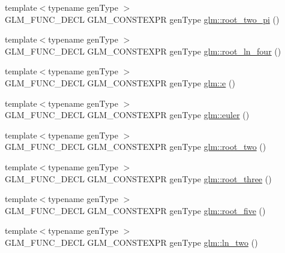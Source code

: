 \begin{DoxyCompactItemize}
\item 
{\footnotesize template$<$typename gen\+Type $>$ }\\G\+L\+M\+\_\+\+F\+U\+N\+C\+\_\+\+D\+E\+CL G\+L\+M\+\_\+\+C\+O\+N\+S\+T\+E\+X\+PR gen\+Type \hyperlink{group__gtc__constants_ga2bcedc575039fe0cd765742f8bbb0bd3}{glm\+::root\+\_\+two\+\_\+pi} ()
\item 
{\footnotesize template$<$typename gen\+Type $>$ }\\G\+L\+M\+\_\+\+F\+U\+N\+C\+\_\+\+D\+E\+CL G\+L\+M\+\_\+\+C\+O\+N\+S\+T\+E\+X\+PR gen\+Type \hyperlink{group__gtc__constants_ga4129412e96b33707a77c1a07652e23e2}{glm\+::root\+\_\+ln\+\_\+four} ()
\item 
{\footnotesize template$<$typename gen\+Type $>$ }\\G\+L\+M\+\_\+\+F\+U\+N\+C\+\_\+\+D\+E\+CL G\+L\+M\+\_\+\+C\+O\+N\+S\+T\+E\+X\+PR gen\+Type \hyperlink{group__gtc__constants_ga4b7956eb6e2fbedfc7cf2e46e85c5139}{glm\+::e} ()
\item 
{\footnotesize template$<$typename gen\+Type $>$ }\\G\+L\+M\+\_\+\+F\+U\+N\+C\+\_\+\+D\+E\+CL G\+L\+M\+\_\+\+C\+O\+N\+S\+T\+E\+X\+PR gen\+Type \hyperlink{group__gtc__constants_gad8fe2e6f90bce9d829e9723b649fbd42}{glm\+::euler} ()
\item 
{\footnotesize template$<$typename gen\+Type $>$ }\\G\+L\+M\+\_\+\+F\+U\+N\+C\+\_\+\+D\+E\+CL G\+L\+M\+\_\+\+C\+O\+N\+S\+T\+E\+X\+PR gen\+Type \hyperlink{group__gtc__constants_ga74e607d29020f100c0d0dc46ce2ca950}{glm\+::root\+\_\+two} ()
\item 
{\footnotesize template$<$typename gen\+Type $>$ }\\G\+L\+M\+\_\+\+F\+U\+N\+C\+\_\+\+D\+E\+CL G\+L\+M\+\_\+\+C\+O\+N\+S\+T\+E\+X\+PR gen\+Type \hyperlink{group__gtc__constants_ga4f286be4abe88be1eed7d2a9f6cb193e}{glm\+::root\+\_\+three} ()
\item 
{\footnotesize template$<$typename gen\+Type $>$ }\\G\+L\+M\+\_\+\+F\+U\+N\+C\+\_\+\+D\+E\+CL G\+L\+M\+\_\+\+C\+O\+N\+S\+T\+E\+X\+PR gen\+Type \hyperlink{group__gtc__constants_gae9ebbded75b53d4faeb1e4ef8b3347a2}{glm\+::root\+\_\+five} ()
\item 
{\footnotesize template$<$typename gen\+Type $>$ }\\G\+L\+M\+\_\+\+F\+U\+N\+C\+\_\+\+D\+E\+CL G\+L\+M\+\_\+\+C\+O\+N\+S\+T\+E\+X\+PR gen\+Type \hyperlink{group__gtc__constants_ga24f4d27765678116f41a2f336ab7975c}{glm\+::ln\+\_\+two} ()
\item 

\end{DoxyCompactItemize}
